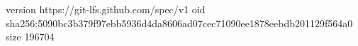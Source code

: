 version https://git-lfs.github.com/spec/v1
oid sha256:5090bc3b379f97ebb5936d4da8606ad07cec71090ee1878eebdb201129f564a0
size 196704
